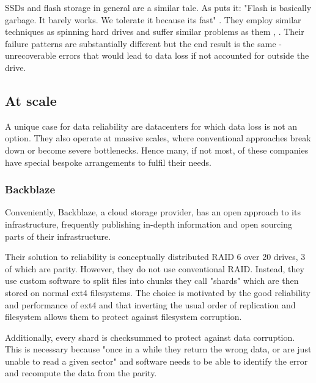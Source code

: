             SSDs and flash storage in general are a similar tale. As
            \citeauthor{2D_RAID} puts it: "Flash is basically garbage. It
            barely works. We tolerate it because its fast" \cite{2D_RAID}. They
            employ similar techniques as spinning hard drives and suffer
            similar problems as them \cite{flash_large_scale},
            \cite{flash_reliability}. Their failure patterns are substantially
            different but the end result is the same - unrecoverable errors
            that would lead to data loss if not accounted for outside the
            drive.

        \subsection{At scale}

            A unique case for data reliability are datacenters for which data
            loss is not an option. They also operate at massive scales, where
            conventional approaches break down or become severe bottlenecks.
            Hence many, if not most, of these companies have special bespoke
            arrangements to fulfil their needs.

            \subsubsection{Backblaze}

                Conveniently, Backblaze, a cloud storage provider, has an open
                approach to its infrastructure, frequently publishing in-depth
                information and open sourcing parts of their infrastructure.

                Their solution \cite{Backblaze_arch} to reliability is
                conceptually distributed RAID 6 over 20 drives, 3 of which are
                parity. However, they do not use conventional RAID. Instead,
                they use custom software to split files into chunks they call
                "shards" which are then stored on normal ext4 filesystems. The
                choice is motivated by the good reliability and performance of
                ext4 and that inverting the usual order of replication and
                filesystem allows them to protect against filesystem
                corruption.

                Additionally, every shard is checksummed to protect against
                data corruption. This is necessary because "once in a while
                they return the wrong data, or are just unable to read a given
                sector" \cite{Backblaze_arch} and software needs to be able to
                identify the error and recompute the data from the parity.

